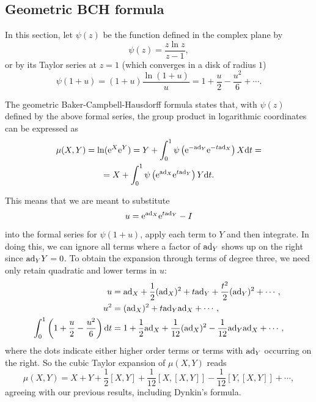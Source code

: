 \subsection{Geometric BCH formula}

In this section, let $\psi(z)$ be the function defined in the complex plane by
\[\psi(z)=\frac{z\ln z}{z-1},\]
or by its Taylor series at $z=1$ (which converges in a disk of radius $1$)
\[\psi(1+u)=(1+u)\frac{\ln (1+u)}{u}=1+\frac{u}{2}-\frac{u^2}{6}+\cdots .\]

\begin{thm}
The geometric Baker-Campbell-Hausdorff formula states that, with $\psi(z)$ defined by the above formal series, the group product in logarithmic coordinates can be expressed as
\begin{multline}
    \mu(X,Y) =\ln(\mathrm{e}^X\mathrm{e}^Y)=
    Y+\int_0^1\psi\left(\mathrm{e}^{-\mathrm{ad}_Y}\mathrm{e}^{-t\mathrm{ad}_X}\right)X{\mathrm{d}} t=\\
    =X+\int_0^1\psi\left(\mathrm{e}^{\mathrm{ad}_X}\mathrm{e}^{t\mathrm{ad}_Y}\right)Y{\mathrm{d}} t.\label{eq geom BCH}
\end{multline}
\end{thm}

This means that we are meant to substitute 
\[u=\mathrm{e}^{\mathrm{ad}_X}\mathrm{e}^{t\mathrm{ad}_Y}-I\]
into the formal series for $\psi(1+u)$, apply each term to $Y$ and then integrate. In doing this, we can ignore all terms where a factor of $\mathrm{ad}_Y$ shows up on the right since $\mathrm{ad}_Y Y=0$. To obtain the expansion through terms of degree three, we need only retain quadratic and lower terms in $u$:
\begin{align}
    u  &=\mathrm{ad}_X+\frac12(\mathrm{ad}_X)^2+t\mathrm{ad}_Y+\frac{t^2}{2}(\mathrm{ad}_Y)^2+\cdots,\\
    u^2&=(\mathrm{ad}_X)^2+t\mathrm{ad}_Y\mathrm{ad}_X+\cdots,\\
    \int_0^1\left(1+\frac u2-\frac{u^2}{6}\right){\mathrm{d}} t&= 1+\frac 12\mathrm{ad}_X+\frac{1}{12}(\mathrm{ad}_X)^2-\frac{1}{12}\mathrm{ad}_Y \mathrm{ad}_X+\cdots,
\end{align}
where the dots indicate either higher order terms or terms with $\mathrm{ad}_Y$ occurring on the right. So the cubic Taylor expansion of $\mu(X,Y)$ reads
\[\mu(X,Y)=X+Y+\frac12[X,Y]+\frac{1}{12}[X,[X,Y]]-\frac{1}{12}[Y,[X,Y]]+\cdots,\]
agreeing with our previous results, including Dynkin's formula.

